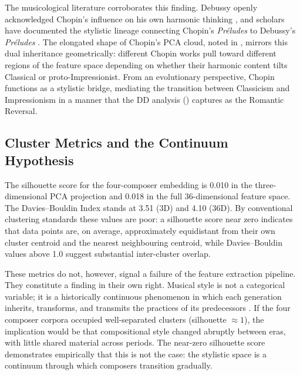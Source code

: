 \documentclass[]{interact}
\theoremstyle{plain}
\theoremstyle{definition}
\theoremstyle{remark}
\begin{document}
The musicological literature corroborates this finding. Debussy openly
acknowledged Chopin's influence on his own harmonic thinking
\citep{Lesure2019}, and scholars
have documented the stylistic lineage connecting Chopin's \emph{Pr\'eludes}
to Debussy's \emph{Pr\'eludes} \citep{Samson1992,DeVoto2003}. The
elongated shape of Chopin's PCA cloud, noted in ,
mirrors this dual inheritance geometrically: different Chopin works pull
toward different regions of the feature space depending on whether their
harmonic content tilts Classical or proto-Impressionist. From an
evolutionary perspective, Chopin functions as a stylistic bridge,
mediating the transition between Classicism and Impressionism in a
manner that the DD analysis () captures as the
Romantic Reversal.

\subsection{Cluster Metrics and the Continuum Hypothesis}

The silhouette score for the four-composer embedding is 0.010 in the
three-dimensional PCA projection and 0.018 in the full 36-dimensional
feature space. The Davies--Bouldin Index stands at 3.51 (3D) and 4.10
(36D). By conventional clustering standards these values are poor:
a silhouette score near zero indicates that data points are, on average,
approximately equidistant from their own cluster centroid and the
nearest neighbouring centroid, while Davies--Bouldin values above 1.0
suggest substantial inter-cluster overlap.

These metrics do not, however, signal a failure of the feature extraction
pipeline. They constitute a finding in their own right. Musical style
is not a categorical variable; it is a historically continuous
phenomenon in which each generation inherits, transforms, and
transmits the practices of its predecessors
\citep{Meyer1989}. If the four composer
corpora occupied well-separated clusters (silhouette $\approx 1$),
the implication would be that compositional style changed abruptly
between eras, with little shared material across periods. The
near-zero silhouette score demonstrates empirically that this is
not the case: the stylistic space is a continuum through which
composers transition gradually.
\end{document}
